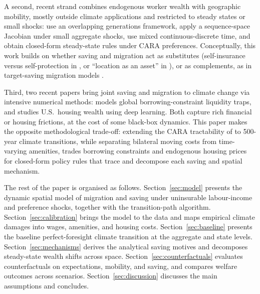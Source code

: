 \documentclass[11pt, a4paper]{article}
\begin{document}
A second, recent strand combines endogenous worker wealth with geographic mobility, mostly outside climate applications and restricted to steady states or small shocks: \citet{giannone_unpacking_2023} use an overlapping generations framework, \citet{donald_optimal_2025} apply a sequence-space Jacobian under small aggregate shocks, \citet{greaney_dynamic_2025} use mixed continuous-discrete time, and \citet{dvorkin_geography_2025} obtain closed-form steady-state rules under CARA preferences. Conceptually, this work builds on whether saving and migration act as substitutes (self-insurance versus self-protection in \citet{ehrlich_market_1972}, or ``location as an asset'' in \citet{bilal_location_2021}), or as complements, as in target-saving migration models \citep{berninghaus_role_1993}.

Third, two recent papers bring joint saving and migration to climate change via intensive numerical methods: \citet{abajian_savings_2025} models global borrowing-constraint liquidity traps, and \citet{sun_wealth_2025} studies U.S.\ housing wealth using deep learning. Both capture rich financial or housing frictions, at the cost of some black-box dynamics. This paper makes the opposite methodological trade-off: extending the CARA tractability of \citet{dvorkin_geography_2025} to 500-year climate transitions, while separating bilateral moving costs from time-varying amenities, trades borrowing constraints and endogenous housing prices for closed-form policy rules that trace and decompose each saving and spatial mechanism.

The rest of the paper is organised as follows. Section~\ref{sec:model} presents the dynamic spatial model of migration and saving under uninsurable labour-income and preference shocks, together with the transition-path algorithm. Section~\ref{sec:calibration} brings the model to the data and maps empirical climate damages into wages, amenities, and housing costs. Section~\ref{sec:baseline} presents the baseline perfect-foresight climate transition at the aggregate and state levels. Section~\ref{sec:mechanisms} derives the analytical saving motives and decomposes steady-state wealth shifts across space. Section~\ref{sec:counterfactuals} evaluates counterfactuals on expectations, mobility, and saving, and compares welfare outcomes across scenarios. Section~\ref{sec:discussion} discusses the main assumptions and concludes.
\end{document}
